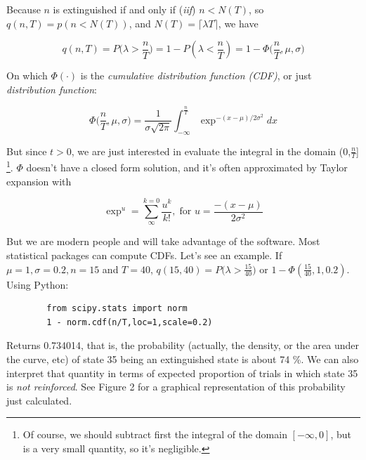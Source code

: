 \documentclass[11pt]{article}
\begin{document}
Because $n$ is extinguished if and only if (\textit{iif}) $n < N(T)$, so $q(n,T) = p(n < N(T))$,
and $N(T) = \lceil \lambda T \rceil$, we have

    \[
        q(n,T) = P \Big(\lambda > \frac{n}{T}\Big) = 1 - P(\lambda < \frac{n}{T}) = 1 - \Phi \Big (\frac{n}{T}, \mu, \sigma \Big)
    \]


On which $\Phi (\cdot)$ is the \textit{cumulative distribution function (CDF)}, or just \textit{distribution function}:

    \[
        \Phi \Big( \frac{n}{T}, \mu, \sigma \Big) = \frac{1}{\sigma \sqrt{2 \pi}} \int_{-\infty}^{\frac{n}{T}} \exp^{-(x - \mu)/2\sigma^2}dx
    \]

But since $t > 0$, we are just interested in evaluate the integral in the domain (0,$\frac{n}{T}$] \footnote{Of course,
    we should subtract first the integral of the domain $[-\infty, 0]$, but is a very small quantity, so it's negligible.}.
$\Phi$ doesn't have a closed form solution, and it's often approximated by Taylor expansion with

    \[
        \exp^{u} = \sum^{k=0}_{\infty} \frac{u^k}{k!}, \; \text{for } u = \frac{-(x - \mu)}{2 \sigma^2}
    \]

But we are modern people and will take advantage of the software.
Most statistical packages can compute CDFs.
Let's see an example.
If $\mu = 1, \sigma = 0.2, n = 15$
and $T = 40$, $q(15,40) = P \Big( \lambda > \frac{15}{40} \Big)$ or $1 - \Phi(\frac{15}{40},1,0.2)$. Using \textsf{Python}:

    \begin{verbatim}
        from scipy.stats import norm
        1 - norm.cdf(n/T,loc=1,scale=0.2)
    \end{verbatim}

Returns 0.734014, that is, the probability (actually, the density, or the area under the curve, etc) of state 35 being an
    extinguished state is about 74 \%.
    We can also interpret that quantity in terms of expected proportion of trials in which state 35 is \textit{not reinforced}.
    See Figure 2 for a graphical representation of this probability just calculated.
\end{document}
